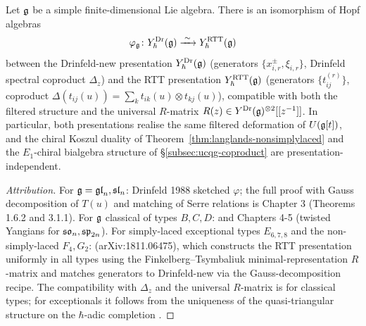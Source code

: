 \begin{theorem}
\label{thm:yangian-two-presentations-equivalent}
\ClaimStatusProvedElsewhere
Let $\mathfrak{g}$ be a simple finite-dimensional Lie algebra. There is an
isomorphism of Hopf algebras
\[
 \varphi_{\mathfrak{g}}\colon Y_{\hbar}^{\mathrm{Dr}}(\mathfrak{g})
 \xrightarrow{\;\sim\;} Y_{\hbar}^{\mathrm{RTT}}(\mathfrak{g})
\]
between the Drinfeld-new presentation $Y_{\hbar}^{\mathrm{Dr}}(\mathfrak{g})$
(generators $\{x_{i,r}^{\pm}, \xi_{i,r}\}$, Drinfeld spectral coproduct
$\Delta_z$) and the RTT presentation $Y_{\hbar}^{\mathrm{RTT}}(\mathfrak{g})$
(generators $\{t_{ij}^{(r)}\}$, coproduct
$\Delta(t_{ij}(u)) = \sum_k t_{ik}(u)\otimes t_{kj}(u)$), compatible
with both the filtered structure and the universal $R$-matrix
$R(z)\in Y^{\mathrm{Dr}}(\mathfrak{g})^{\otimes 2}[[z^{-1}]]$. In particular,
both presentations realise the same filtered deformation of
$U(\mathfrak{g}[t])$, and the chiral Koszul duality of
Theorem~\ref{thm:langlands-nonsimplylaced} and the $E_1$-chiral
bialgebra structure of \S\ref{subsec:ucqg-coproduct} are
presentation-independent.
\end{theorem}

\begin{proof}[Attribution]
For $\mathfrak{g} = \mathfrak{gl}_n, \mathfrak{sl}_n$: Drinfeld 1988 sketched $\varphi$; the
full proof with Gauss decomposition of $T(u)$ and matching of Serre
relations is \cite{Molev07} Chapter 3 (Theorems 1.6.2 and 3.1.1). For
$\mathfrak{g}$ classical of types $B, C, D$: \cite{AMR06} and \cite{Molev07}
Chapters 4-5 (twisted Yangians for $\mathfrak{so}_n, \mathfrak{sp}_{2n}$). For simply-laced
exceptional types $E_{6,7,8}$ and the non-simply-laced $F_4, G_2$:
\cite{GuayRegelskisWendlandt18} (arXiv:1811.06475), which
constructs the RTT presentation uniformly in all types using the
Finkelberg--Tsymbaliuk minimal-representation $R$-matrix and matches
generators to Drinfeld-new via the Gauss-decomposition recipe. The
compatibility with $\Delta_z$ and the universal $R$-matrix is
\cite{KhoroshkinTolstoy96} for classical types; for exceptionals it
follows from the uniqueness of the quasi-triangular structure on the
$\hbar$-adic completion \cite{Drinfeld89}. \qedhere
\end{proof}

